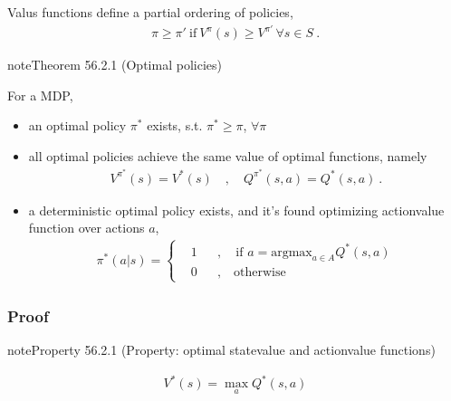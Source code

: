 \documentclass[letterpaper,10pt,english]{jupyterBook}
\begin{document}
\sphinxAtStartPar
Valus functions define a partial ordering of policies,
\begin{equation*}
\begin{split}\pi \ge \pi' \ \text{if} \ V^{\pi}(s) \ge V^{\pi'} \, \forall s \in S \ .\end{split}
\end{equation*}\label{ch/rl/mdp:theorem-2}
\begin{sphinxadmonition}{note}{Theorem 56.2.1 (Optimal policies)}



\sphinxAtStartPar
For a MDP,
\begin{itemize}
\item {} 
\sphinxAtStartPar
an optimal policy \(\pi^*\) exists, s.t. \(\pi^* \ge \pi\), \(\forall \pi\)

\item {} 
\sphinxAtStartPar
all optimal policies achieve the same value of optimal functions, namely
\begin{equation*}
\begin{split}V^{\pi^*}(s) = V^*(s) \quad , \quad Q^{\pi^*}(s,a) = Q^*(s,a) \ . \end{split}
\end{equation*}
\item {} 
\sphinxAtStartPar
a deterministic optimal policy exists, and it’s found optimizing action\sphinxhyphen{}value function over actions \(a\),
\begin{equation*}
\begin{split}\pi^*(a|s) = \left\{ 
  \begin{aligned}
     & 1  && , \quad  \text{if } a = \text{argmax}_{a \in A} Q^*(s,a) \\
     & 0  && , \quad  \text{otherwise}
  \end{aligned}
  \right.
  \end{split}
\end{equation*}
\end{itemize}
\end{sphinxadmonition}
\subsubsection*{Proof}

\sphinxAtStartPar
{}
\label{ch/rl/mdp:prop:optimal-v-q}
\begin{sphinxadmonition}{note}{Property 56.2.1 (Property: optimal state\sphinxhyphen{}value and action\sphinxhyphen{}value functions)}


\begin{equation}\label{equation:ch/rl/mdp:eq:optimality-condition}
\begin{split}V^*(s) = \max_a Q^{*}(s,a)\end{split}
\end{equation}
\sphinxAtStartPar
{} 
\end{sphinxadmonition}
\end{document}
